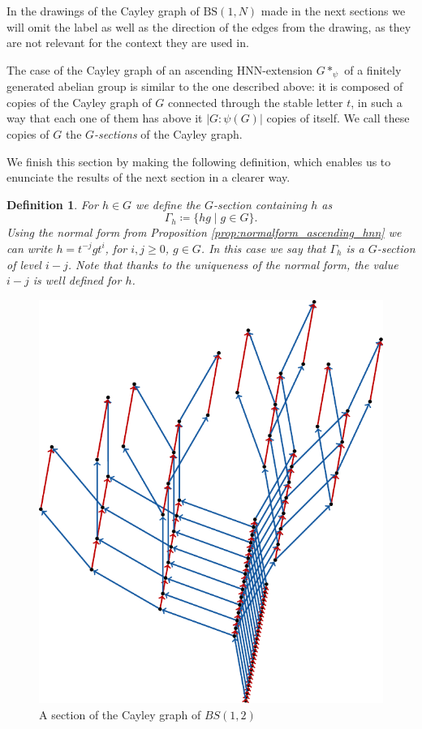 \documentclass[cupthm,crop,info]{CUP-JNL-ETS}%
\theoremstyle{cupplain}
\theoremstyle{cupdefinition}
\newtheorem{definition}{Definition}[section]
\theoremstyle{cupremark}
\theoremstyle{cupproof}
\numberwithin{equation}{section}
\newcommand{\BS}[1][N]{\mathrm{BS}(1,#1)}
\begin{document}
In the drawings of the Cayley graph of $\BS$ made in the next sections we will omit the label as well as the direction of the edges from the drawing, as they are not relevant for the context they are used in.

The case of the Cayley graph of an ascending HNN-extension $G*_{\psi}$ of a finitely generated abelian group is similar to the one described above: it is composed of copies of the Cayley graph of $G$ connected through the stable letter $t$, in such a way that each one of them has above it $|G:\psi(G)|$ copies of itself. We call these copies of $G$ the $G$\textit{-sections} of the Cayley graph.

We finish this section by making the following definition, which enables us to enunciate the results of the next section in a clearer way.
\begin{definition}
	For $h\in G$ we define the \textit{$G$-section containing $h$} as
	$$
	\Gamma_{h}\coloneqq \{hg\mid g\in G \}.
	$$
	Using the normal form from Proposition \ref{prop:normalform_ascending_hnn} we can write $h=t^{-j}gt^i$, for $i,j\ge 0$, $g\in G$. In this case we say that $\Gamma_h$ is a \textit{$G$-section of level $i-j$}. Note that thanks to the uniqueness of the normal form, the value $i-j$ is well defined for $h$.
\end{definition}
\begin{figure}[h]
	\centering
	\includegraphics[scale=0.8]{bs_section.pdf}
	\caption{A section of the Cayley graph of $BS(1,2)$}
	\label{fig:section_cayley_graph_bs}
\end{figure}
\end{document}
